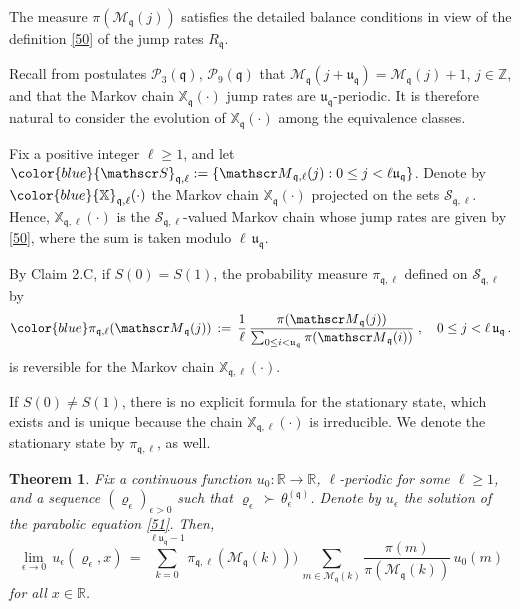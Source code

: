\documentclass[reqno]{amsart}
\theoremstyle{plain}
\newtheorem{theorem}{Theorem}[section]
\theoremstyle{definition}
\newcommand{\mc}[1]{{\mathcal #1}}
\newcommand{\mf}[1]{{\mathfrak #1}}
\newcommand{\bb}[1]{{\mathbb #1}}
\newcommand{\ms}[1]{{\mathscr #1}}
\newcounter{as}[section]
\newcommand{\<}{\langle}
\renewcommand{\>}{\rangle}
\begin{document}
The measure $\pi(\ms M_{\mf q} (j))$ satisfies the detailed balance
conditions in view of the definition \eqref{50} of the jump rates
$R_{\mf q}$.
\smallskip

Recall from postulates $\mc P_3(\mf q)$, $\mc P_9(\mf q)$ that
$\ms M_{\mf q} (j+\mf u_{\mf q}) = \ms M_{\mf q} (j) +1$,
$j\in \bb Z$, and that the Markov chain $\bb X_{\mf q} (\cdot)$ jump
rates are $\mf u_{\mf q}$-periodic. It is therefore natural to
consider the evolution of $\bb X_{\mf q} (\cdot)$ among the
equivalence classes.

Fix a positive integer $\ell \ge 1$, and let
${\color{blue} \ms S_{\mf q, \ell} }:= \{\ms M_{\mf q, \ell}(j) : 0\le
j <\ell \mf u_{\mf q} \}$.  Denote by
$\color{blue} \bb X_{\mf q, \ell} (\cdot)$ the Markov chain
$\bb X_{\mf q} (\cdot)$ projected on the sets $\ms S_{\mf q,
\ell}$. Hence, $\bb X_{\mf q, \ell} (\cdot)$ is the
$\ms S_{\mf q, \ell}$-valued Markov chain whose jump rates are given
by \eqref{50}, where the sum is taken modulo $\ell\, \mf u_{\mf q}$.

By Claim 2.C, if $S(0)=S(1)$, the probability measure
$\pi_{\mf q, \ell}$ defined on
$\ms S_{\mf q, \ell}$ by
\begin{equation}
\label{102}
{\color{blue} \pi_{\mf q, \ell} (\ms M_{\mf q} (j))}
\,:=\, \frac{1}{\ell}\, \frac{\pi(\ms M_{\mf q} (j)) }{\sum_{0\le i<
\mf u_{\mf q}} \pi(\ms M_{\mf q} (i))}\;, \quad 0\le j< \ell\, \mf
u_{\mf q}\,.
\end{equation}
is reversible for the Markov chain $\bb X_{\mf q, \ell} (\cdot)$.

If $S(0) \neq S(1)$, there is no explicit formula for the stationary
state, which exists and is unique because the chain
$\bb X_{\mf q, \ell} (\cdot)$ is irreducible. We denote the
stationary state by $\pi_{\mf q, \ell}$, as well.

\begin{theorem}
\label{mt5}
Fix a continuous function $u_0\colon \bb R \to \bb R$, $\ell$-periodic
for some $\ell\ge 1$, and a sequence
$(\varrho_{\epsilon})_{\epsilon>0}$ such that
$\varrho_{\epsilon} \,\succ\, \theta_{\epsilon}^{(\mathfrak{q})}$.
Denote by $u_\epsilon$ the solution of the parabolic equation
\eqref{51}.  Then,
\begin{equation*}
\lim_{\epsilon\to0}\,u_{\epsilon}(\varrho_{\epsilon} , x)
\,=\, \sum_{k=0}^{\ell \mf u_{\mf q}- 1}
\pi_{\mf q, \ell} (\ms M_{\mf q}(k)))\,
\sum_{m \in \ms M_{\mf q} (k)}
\frac{\pi(m)}{\pi(\ms M_{\mf q}(k))}
\, u_{0}(m)
\end{equation*}
for all $x\in \bb R$.
\end{theorem}
\end{document}
